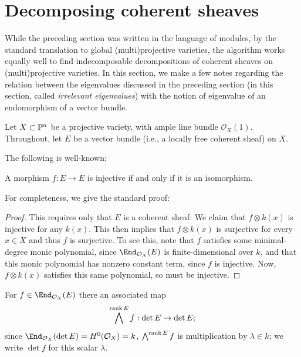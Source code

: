 \documentclass[12pt]{article}
\let\l\lambda
\def\O{\mathcal O}
\numberwithin{equation}{section}
\theoremstyle{theorem}
\numberwithin{thm}{section}
\theoremstyle{definition}
\begin{document}
\section{Decomposing coherent sheaves}

While the preceding section was written in the language of modules, by the standard translation to global (multi)projective varieties, the algorithm works equally well to find indecomposable decompositions of coherent sheaves on (multi)projective varieties.
In this section, we make a few notes regarding the relation between the eigenvalues discussed in the preceding section (in this section, called \emph{irrelevant eigenvalues}) with the notion of eigenvalue of an endomorphism of a vector bundle.

Let $X\subset \P^n$ be a projective variety, with ample line bundle $\O_X(1)$.
Throughout, let $E$ be a vector bundle (i.e., a locally free coherent sheaf) on $X$.

The following is well-known:

\begin{lem}
A morphism $f:E\to E$ is injective if and only if it is an isomorphism.
\end{lem}


For completeness, we give the standard proof:

\begin{proof}
This requires only that $E$ is a coherent sheaf:
We claim that $f\otimes k(x)$ is injective for any $k(x)$. This then implies that $f\otimes k(x)$ is surjective for every $x\in X$ and thus $f$ is surjective.
To see this, note that $f$ satisfies some minimal-degree monic polynomial, since $\End_{\O_X}(E)$ is finite-dimensional over $k$, and that this monic polynomial has nonzero constant term, since $f$ is injective. Now, $f\otimes k(x)$ satisfies this same polynomial, so must be injective.
\end{proof}

\begin{dfn}
For $f\in \End_{\O_X}(E)$ there an associated map
$$ \bigwedge^{\rank E} f: \det E\to \det E; $$
since $\End_{\O_X}(\det E) = H^0(\O_X)=k$, $\bigwedge^{\rank E} f$ is multiplication by $\l\in k$; we write $\det f$ for this scalar $\l$.
\end{dfn}
\end{document}
